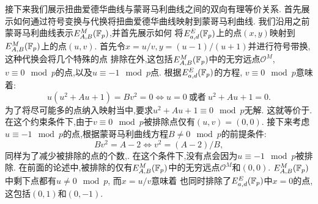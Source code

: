 接下来我们展示扭曲爱德华曲线与蒙哥马利曲线之间的双向有理等价关系.
首先展示如何通过符号变换与代换将扭曲爱德华曲线映射到蒙哥马利曲线.
我们沿用之前蒙哥马利曲线表示$E_{A,B}^M(\mathbb{F}_p)$,并首先展示如何
将$E_{a,d}^E(\mathbb{F}_p)$上的点$(x,y)$映射到$E_{A,B}^M(\mathbb{F}_p)$上的点$(u,v)$.
首先令$x = u/v, y = (u-1)/(u+1)$并进行符号带换,这种代换会将几个特殊的点
排除在外,这包括$E_{A,B}^M(\mathbb{F}_p)$中的无穷远点$\mathcal{O}^M$,
$v\equiv 0 \mod p$的点,以及$u\equiv -1 \mod p$点.
根据$E_{a,d}^E(\mathbb{F}_p)$的方程, $v\equiv 0 \mod p$意味着:
$$u(u^2 + Au + 1) = Bv^2 = 0 \iff u = 0\ \text{或者}\ u^2 + Au + 1 = 0. $$
为了将尽可能多的点纳入映射当中,要求$u^2 + Au + 1 \equiv 0 \mod p$无解.
这就等价于.
在这个约束条件下,由于$v\equiv 0 \mod p$被排除点仅有$(u,v) = (0,0)$.
接下来考虑$u\equiv -1 \mod p$的点,根据蒙哥马利曲线方程$B\neq 0\mod p$的前提条件:
$$Bv^2 = A - 2 \iff v^2 = (A -2)/B,$$
同样为了减少被排除的点的个数,.
在这个条件下,没有点会因为$u\equiv -1 \mod p$被排除.
在前面的论述中,被排除的仅有$E_{A,B}^M(\mathbb{F}_p)$中的无穷远点$\mathcal{O}^M$和$(0,0)$.
$E_{A,B}^M(\mathbb{F}_p)$中剩下点都有$u\neq 0 \mod p$, 而$x = u/v$意味着
也同时排除了$E_{a,d}^E(\mathbb{F}_p)$中$x = 0$的点,这包括$(0,1)$和$(0,-1)$.

